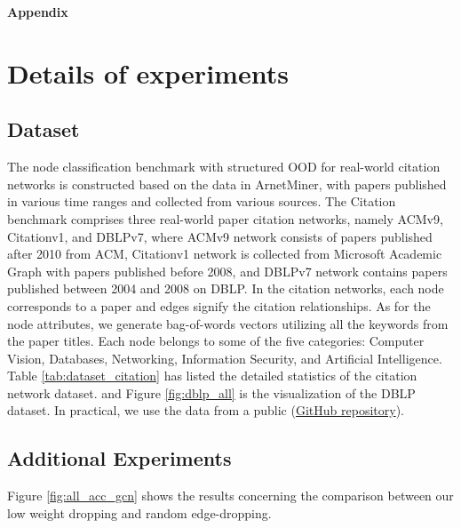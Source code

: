 
\clearpage
\onecolumn
\appendix
    \begin{center}
    \Large
    \textbf{Appendix}
     \\[20pt]
    \end{center}
   
\section{Details of experiments}
\subsection{Dataset}
The node classification benchmark with structured OOD for real-world citation networks is constructed based on the data in ArnetMiner\cite{tang2008arnetminer}, with papers published in various time ranges and collected from various sources. The Citation benchmark comprises three real-world paper citation networks, namely ACMv9, Citationv1, and DBLPv7, where ACMv9 network consists of papers published after 2010 from ACM, Citationv1 network is collected from Microsoft Academic Graph with papers published before 2008, and DBLPv7 network contains papers published between 2004 and 2008 on DBLP. In the citation networks, each node corresponds to a paper and edges signify the citation relationships. As for the node attributes, we generate bag-of-words vectors utilizing all the keywords from the paper titles. Each node belongs to some of the five categories:  Computer Vision, Databases, Networking, Information Security, and Artificial Intelligence. Table \ref{tab:dataset_citation} has listed the detailed statistics of the citation network dataset.
and Figure \ref{fig:dblp_all} is the visualization of the DBLP dataset.
In practical, we use the data from a public  (\href{https://github.com/shenxiaocam/ACDNE/tree/master/ACDNE_codes/input}{GitHub repository})\cite{shen2020adversarial}.




\subsection{Additional Experiments}
Figure \ref{fig:all_acc_gcn} shows the results concerning the comparison between our  low weight dropping and random edge-dropping.